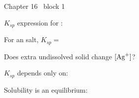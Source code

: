 \documentclass{apchem-worksheet}
\begin{document}
\begin{spiralstrip}{Chapter 16 \textbullet\ block 1}
  \item $K_{sp}$ expression for :
  \item For an  salt, $K_{sp} = $ 
  \item Does extra undissolved solid change $[\ce{Ag+}]$?
  \item $K_{sp}$ depends only on: 
  \item Solubility is an equilibrium: 
\end{spiralstrip}
\end{document}
